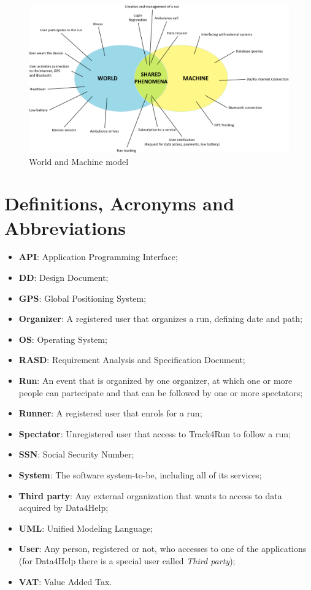 \begin{figure}[H]
\begin{center}
  \includegraphics[width=\textwidth]{img/WorldMachine.png}
  \hspace{0.05\linewidth}
  \centering
  \caption{World and Machine model}
  \label{img:WandMmodel}
\end{center}
\end{figure}

\section{Definitions, Acronyms and Abbreviations}
\begin{itemize}
  \setlength{\itemindent}{-.4in}
  \item[] \textbf{API}: Application Programming Interface;
  \item[] \textbf{DD}: Design Document;
  \item[] \textbf{GPS}: Global Positioning System;
  \item[] \textbf{Organizer}: A registered user that organizes a run, defining date and path;
  \item[] \textbf{OS}: Operating System;
  \item[] \textbf{RASD}: Requirement Analysis and Specification Document;
  \item[] \textbf{Run}: An event that is organized by one organizer, at which one or more people can partecipate and that can be followed by one or more spectators;
  \item[] \textbf{Runner}: A registered user that enrols for a run;
  \item[] \textbf{Spectator}: Unregistered user that access to Track4Run to follow a run;
  \item[] \textbf{SSN}: Social Security Number;
  \item[] \textbf{System}: The software system-to-be, including all of its services;
  \item[] \textbf{Third party}: Any external organization that wants to access to data acquired by Data4Help;
  \item[] \textbf{UML}: Unified Modeling Language;
  \item[] \textbf{User}: Any person, registered or not, who accesses to one of the applications (for Data4Help there is a special user called \textit{Third party});
  \item[] \textbf{VAT}: Value Added Tax.
\end{itemize}

